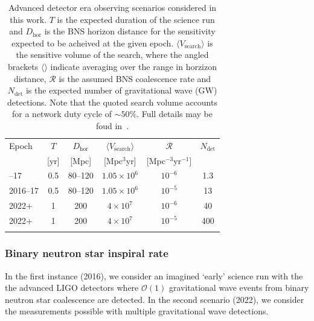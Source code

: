 \documentclass[twocolumn,nofootinbib]{revtex4-1}
\newcommand{\cbcrate}{{{\mathcal R}}}
\def\gw#1{gravitational wave#1 (GW#1)\gdef\gw{GW}}
\begin{document}
\begin{table}
\centering
\begin{tabular}{l c c c c c }
\toprule
Epoch & $T$ & $D_{\mathrm{hor}}$ &
$\langle V_{\mathrm{search}}\rangle$ & $\cbcrate$ & $N_{\mathrm{det}}$ \\
 & [yr] & [Mpc] & [Mpc$^3$yr] &  [Mpc$^{-3}$yr$^{-1}$] \\
\colrule
2016--17 & 0.5 & 80--120 & $1.05\times10^6$ & $10^{-6}$ & 1.3 \\
2016--17 & 0.5 & 80--120 & $1.05\times10^6$ & $10^{-5}$ & 13 \\
2022+ & 1 & 200 & $4\times10^7$ & $10^{-6}$ & 40 \\
2022+ & 1 & 200 & $4\times10^7$ & $10^{-5}$ & 400 \\
\botrule
\end{tabular}
\caption{Advanced detector era observing scenarios considered in this work.  $T$
is the expected duration of the science run and $D_{\mathrm{hor}}$ is the BNS
horizon distance for the sensitivity expected to be acheived at the given epoch.
$\langle V_{\mathrm{search}}\rangle $ is the sensitive volume of the search,
where the angled brackets $\langle \rangle$ indicate averaging over the range
in horzizon distance, $\cbcrate$ is the assumed BNS coalescence rate and
$N_{\mathrm{det}}$ is the expected number of \gw{} detections.  Note that the
quoted search volume accounts for a network duty cycle of $\sim 50\%$.
Full details may be foud in~\cite{ade_prospects}.\label{table:scenarios}}
\end{table}


\subsubsection{Binary neutron star inspiral rate}

In the first instance (2016), we consider an imagined `early' science run with the the
advanced LIGO detectors where ${\mathcal O}(1)$ gravitational wave events from
binary neutron star coalescence are detected.  In the second scenario (2022), we
consider the measurements possible with multiple gravitational wave detections.
\end{document}
